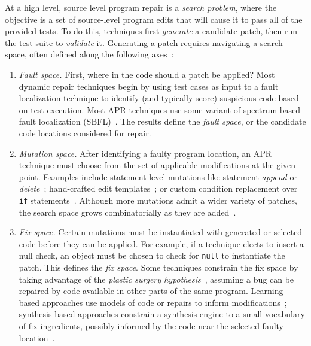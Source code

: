 \documentclass[10pt, conference]{IEEEtran}
\begin{document}
At a high level, source level program repair is a \emph{search problem}, where
the objective is a set of source-level program edits that will cause it to pass
all of the provided tests. To do this, techniques first \emph{generate} a candidate
patch, then run the test suite to \emph{validate} it. Generating a patch
requires navigating a search space, often defined along the
following axes~\cite{ae,sqjo}:
\begin{enumerate}[wide]

\item \emph{Fault space.} First, where 
  in the code should a patch be applied? Most dynamic repair
  techniques begin by using test cases as input to a fault localization
  technique to identify (and typically score) suspicious code
  based on test execution. Most APR techniques
  use some variant of spectrum-based fault localization (SBFL)~\cite{ochiai}. 
  The results define the \emph{fault space}, or the
  candidate code locations considered for repair.

\item \emph{Mutation space.} After identifying a faulty program location, an APR
  technique must choose from the set of applicable modifications at the given
  point. Examples include statement-level mutations like statement \emph{append}
  or \emph{delete}~\cite{genprog-operators}; hand-crafted edit
  templates~\cite{par}; or custom condition
  replacement over \texttt{if} statements~\cite{Xuan17}. Although more mutations
  admit a wider variety of patches, the search space grows combinatorially as
  they are added~\cite{long-search-spaces}.

\item \emph{Fix space.} Certain mutations must be instantiated with generated or
  selected code before they can be applied. For example, if a technique elects
  to insert a null check, an object must be chosen to check for 
  \texttt{null} to instantiate the patch. This defines
  the \emph{fix space}. Some techniques
  constrain the fix space by taking advantage of the \emph{plastic surgery
    hypothesis}~\cite{plastic}, assuming a bug can be repaired by code
  available in other parts of the same program. Learning-based
  approaches use models of code or repairs to inform
  modifications~\cite{prophet}; synthesis-based approaches constrain a
  synthesis engine to a small vocabulary of fix ingredients, possibly informed
  by the code near the selected faulty location~\cite{angelix,s3}.


\end{enumerate}
\end{document}
